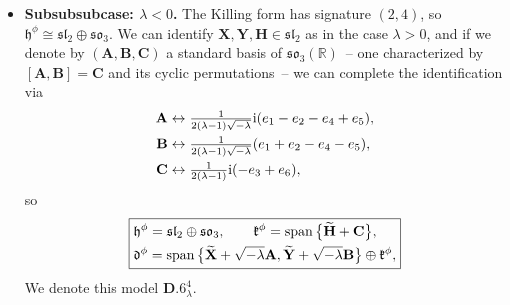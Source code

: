 \documentclass[10pt,a4paper]{amsart}
\newlength{\caseIndent}
\newcommand{\wt} [1]{\smash{\widetilde{#1}}}
\newcommand{\bbR}{\mathbb{R}}
\newcommand{\mbA}{\mathbf{A}}
\newcommand{\mbB}{\mathbf{B}}
\newcommand{\mbC}{\mathbf{C}}
\newcommand{\mbH}{\mathbf{H}}
\newcommand{\mbX}{\mathbf{X}}
\newcommand{\mbY}{\mathbf{Y}}
\newcommand{\mfd} {\mathfrak{d}}
\newcommand{\mfh} {\mathfrak{h}}
\newcommand{\mfk} {\mathfrak{k}}
\newcommand{\mfsl} {\mathfrak{sl}}
\newcommand{\mfso} {\mathfrak{so}}
\numberwithin{equation}{section}
\begin{document}
\begin{itemize}[leftmargin=\caseIndent]
\begin{itemize}[leftmargin=\caseIndent]
\begin{itemize}[leftmargin=\caseIndent]
		\item[] \textbf{Subsubsubcase: $\lambda < 0$.} The Killing form has signature $(2, 4)$, so $\mfh^{\phi} \cong \mfsl_2 \oplus \mfso_3$. We can identify $\mbX, \mbY, \mbH \in \mfsl_2$ as in the case $\lambda > 0$, and if we denote by $(\mbA, \mbB, \mbC)$ a standard basis of $\mfso_3(\bbR)$~-- one characterized by $[\mbA, \mbB] = \mbC$ and its cyclic permutations~-- we can complete the identification via
		\begin{align*}
			\mbA &\leftrightarrow \tfrac{1}{2 (\lambda - 1) \sqrt{-\lambda}} {\rm i} (e_1 - e_2 - e_4 + e_5) , \\
			\mbB &\leftrightarrow \tfrac{1}{2 (\lambda - 1) \sqrt{-\lambda}} (e_1 + e_2 - e_4 - e_5) , \\
			\mbC &\leftrightarrow \tfrac{1}{2 (\lambda - 1)} {\rm i} (-e_3 + e_6) ,
		\end{align*}
		so
			\begin{equation*}
				\boxed{
 \begin{split}
 & \mfh^{\phi} = \mfsl_2 \oplus \mfso_3 , \qquad
	 	 \mfk^{\phi} = \operatorname{span}\big\{\wt\mbH + \mbC\big\} , \\
& \mfd^{\phi} = \operatorname{span}\big\{
								\wt\mbX + \sqrt{-\lambda} \mbA ,
								\wt\mbY + \sqrt{-\lambda} \mbB
							 \big\} \oplus \mfk^{\phi} ,
 \end{split}
				}
			\end{equation*}
		We denote this model $\mathbf{D.6}_{\lambda}^4$.
		\end{itemize}


\end{itemize}
\end{itemize}
\end{document}
